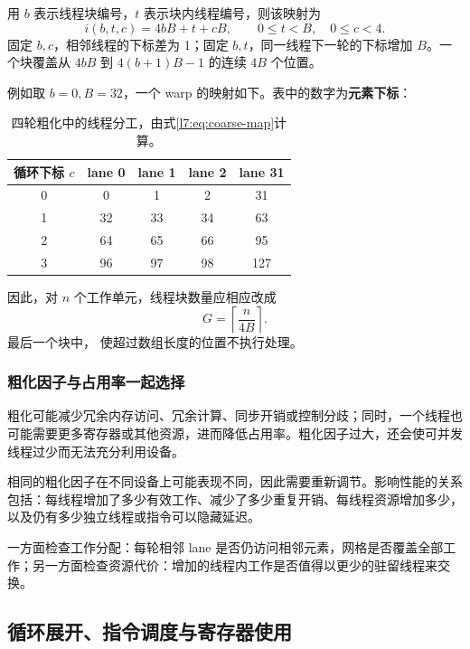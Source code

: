 用 $b$ 表示线程块编号，$t$ 表示块内线程编号，则该映射为
\begin{equation}
  i(b,t,c)=4bB+t+cB,
  \qquad 0\leq t<B,\quad 0\leq c<4.
  \label{l7:eq:coarse-map}
\end{equation}
固定 $b,c$，相邻线程的下标差为 1；固定 $b,t$，同一线程下一轮的下标增加 $B$。一个块覆盖从 $4bB$ 到 $4(b+1)B-1$ 的连续 $4B$ 个位置。

例如取 $b=0,B=32$，一个 warp 的映射如下。表中的数字为\textbf{元素下标}：
\begin{table}[H]
  \centering\small
  \caption{四轮粗化中的线程分工，由式\eqref{l7:eq:coarse-map}计算。}
  \begin{tabular}{@{}ccccc@{}}
  \toprule
  循环下标 $c$ & lane 0 & lane 1 & lane 2 & lane 31\\
  \midrule
  0 & 0 & 1 & 2 & 31\\
  1 & 32 & 33 & 34 & 63\\
  2 & 64 & 65 & 66 & 95\\
  3 & 96 & 97 & 98 & 127\\
  \bottomrule
  \end{tabular}
\end{table}

因此，对 $n$ 个工作单元，线程块数量应相应改成
\begin{equation}
  G=\left\lceil\frac{n}{4B}\right\rceil.
\end{equation}
最后一个块中， 使超过数组长度的位置不执行处理。

\subsubsection{粗化因子与占用率一起选择}
粗化可能减少冗余内存访问、冗余计算、同步开销或控制分歧；同时，一个线程也可能需要更多寄存器或其他资源，进而降低占用率。粗化因子过大，还会使可并发线程过少而无法充分利用设备。

相同的粗化因子在不同设备上可能表现不同，因此需要重新调节。影响性能的关系包括：每线程增加了多少有效工作、减少了多少重复开销、每线程资源增加多少，以及仍有多少独立线程或指令可以隐藏延迟。

\begin{keybox}[title={粗化的两个联合检查}]
一方面检查工作分配：每轮相邻 lane 是否仍访问相邻元素，网格是否覆盖全部工作；另一方面检查资源代价：增加的线程内工作是否值得以更少的驻留线程来交换。
\end{keybox}
\FloatBarrier

\subsection{循环展开、指令调度与寄存器使用}
